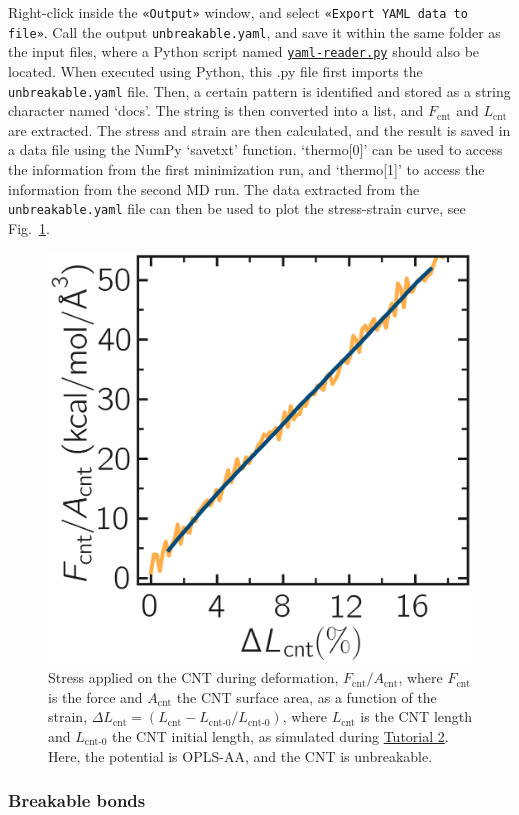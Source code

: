 \documentclass[9pt,tutorial]{livecoms}
\newcommand{\flecmd}[1]{\textcolor{command}{\texttt{#1}}} %
\newcommand{\guicmd}[1]{\textcolor{command}{\texttt{«#1»}}} %
\newcommand{\dwlcmd}[1]{\textcolor{download}{\texttt{#1}}} %
\newcommand{\filepath}{https://raw.githubusercontent.com/lammpstutorials/lammpstutorials-article/main/files/}
\begin{document}
Right-click inside the \guicmd{Output} window, and select
\guicmd{Export YAML data to file}.  Call the output \flecmd{unbreakable.yaml}, and save
it within the same folder as the input files, where a Python script named
\href{\filepath tutorial2/yaml-reader.py}{\dwlcmd{yaml-reader.py}} should also
be located.  When executed using Python, this .py file first imports
the \flecmd{unbreakable.yaml} file.  Then, a certain pattern is
identified and stored as a string character named `docs'.  The string is
then converted into a list, and $F_\text{cnt}$ and $L_\text{cnt}$
are extracted.  The stress and strain
are then calculated, and the result is saved in a data file using the
NumPy `savetxt' function.  `thermo[0]' can be used to access the
information from the first minimization run, and `thermo[1]' to access the
information from the second MD run.  The data extracted from
the \flecmd{unbreakable.yaml} file can then be used to plot the stress-strain
curve, see Fig.~\ref{fig:CNT-stress-strain-unbreakable}.

\begin{figure}
\centering
\includegraphics[width=0.55\linewidth]{CNT-unbreakable-stress-strain}
\caption{Stress applied on the CNT during deformation, $F_\text{cnt}/A_\text{cnt}$,
where $F_\text{cnt}$ is the force and $A_\text{cnt}$ the CNT surface area,
as a function of the strain, $\Delta L_\text{cnt} = (L_\text{cnt}-L_\text{cnt-0}/L_\text{cnt-0})$, where
$L_\text{cnt}$ is the CNT length and $L_\text{cnt-0}$ the CNT initial length,
as simulated during \hyperref[carbon-nanotube-label]{Tutorial 2}.
Here, the potential is OPLS-AA, and the CNT is unbreakable.}
\label{fig:CNT-stress-strain-unbreakable}
\end{figure}

\subsubsection{Breakable bonds}
\end{document}
